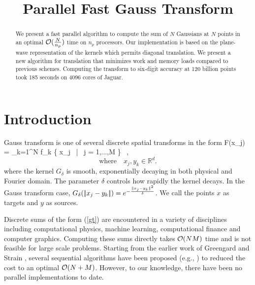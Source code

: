 \documentclass[conference]{IEEEtran}
\begin{document}
\title{Parallel Fast Gauss Transform}  


\author{

\and
{}

\and
{}
}
\date{}
\maketitle

\begin{abstract}
We present a fast parallel algorithm to compute the sum of $N$ Gaussians at $N$ points in an optimal $\mathcal{O}(\frac{N}{n_p})$ time on $n_p$ processors. Our implementation is based on the plane-wave representation of the kernels which permits diagonal translation. We present a new algorithm for translation that minimizes work and memory loads compared to previous schemes.
Computing the transform to six-digit accuracy at 120 billion points took 185 seconds on 4096 cores of Jaguar. 
\end{abstract}

\section{Introduction}  \label{s:intro}
Gauss transform is one of several discrete spatial transforms in the form 
%
\beq F(x_j) = \sum_{k=1}^N  f_k \quad {} \quad \{ x_j \, | \, j = 1,...,M \} \, , \label{gt} \eeq
\[\text{where} \quad x_j, y_k \in \mathbb{R}^d.  \]
%
where the kernel $G_\delta$ is smooth, exponentially decaying in both physical and Fourier domain. The parameter $\delta$ controls how rapidly the kernel decays.  
In the Gauss transform case, $G_\delta (|\!| x_j - y_k |\!|) = e^{-\frac{\|x_j - y_k\|^2}{\delta}}$.  We call the points $x$ as targets and $y$ as sources.  

Discrete sums of the form (\ref{gt}) are encountered in a variety of disciplines including computational physics, machine learning, computational finance and computer graphics. Computing these sums directly takes $\mathcal{O}(NM)$ time and is not feasible for large scale problems. Starting from the earlier work of Greengard and Strain \cite{fgt}, several sequential algorithms have been proposed (e.g.,  \cite{greengard98, duraiswami03, fggt}) to reduced the cost to an optimal $\mathcal{O}(N+M)$. However, to our knowledge, there have been no parallel implementations to date. 
\end{document}
